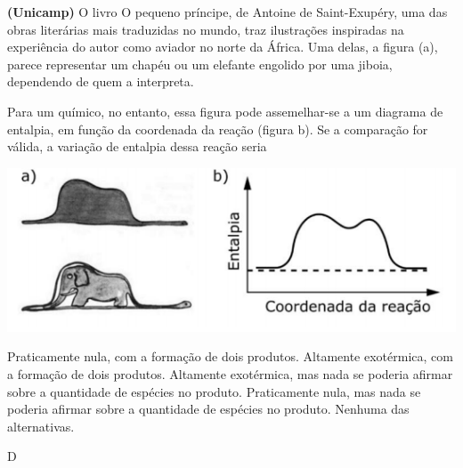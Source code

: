 \documentclass[9 pt]{scrartcl}
\def\PQ{0.84} %
\begin{document}
\begin{exercise}[points=\PQ]
\textbf{(Unicamp)} O livro O pequeno príncipe, de Antoine de Saint-Exupéry, uma das obras literárias mais traduzidas no mundo, traz ilustrações inspiradas na experiência do autor como aviador no norte da África. Uma delas, a figura (a), parece representar um chapéu ou um elefante engolido por uma jiboia, dependendo de quem a interpreta.

Para um químico, no entanto, essa figura pode assemelhar-se a um diagrama de entalpia, em função da coordenada da reação (figura b). Se a comparação for válida, a variação de entalpia dessa reação seria

\begin{center}
\includegraphics[width=.9\linewidth]{Fisico_Quimica/Termoquimica/figurab.jpg}
\end{center}


\begin{choice}
\choice Praticamente nula, com a formação de dois produtos.
\choice Altamente exotérmica, com a formação de dois produtos.
\choice Altamente exotérmica, mas nada se poderia afirmar sobre a quantidade de espécies no produto.
\choice Praticamente nula, mas nada se poderia afirmar sobre a quantidade de espécies no produto. 
\choice Nenhuma das alternativas.
\end{choice}
\end{exercise}
\begin{solution}
D
\end{solution}








\end{document}
